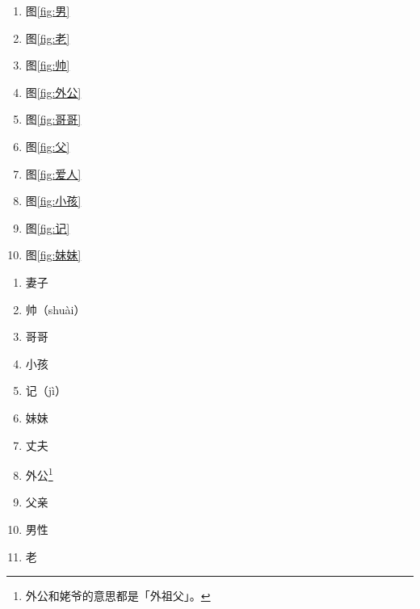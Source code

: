 \documentclass[12pt, a4paper, oneside]{ctexart}
\begin{document}
\begin{multicols}{2}
    \begin{enumerate}[label=\arabic*.]
        \item 图\ref{fig:男}
        \item 图\ref{fig:老}
        \item 图\ref{fig:帅}
        \item 图\ref{fig:外公}
        \item 图\ref{fig:哥哥}
        \item 图\ref{fig:父}
        \item 图\ref{fig:爱人}
        \item 图\ref{fig:小孩}
        \item 图\ref{fig:记}
        \item 图\ref{fig:妹妹}
    \end{enumerate}
    
    \columnbreak
    
    \begin{enumerate}[label=\Roman*.]
        \item 妻子
        \item 帅（shuài）
        \item 哥哥
        \item 小孩
        \item 记（jì）
        \item 妹妹
        \item 丈夫
        \item 外公\footnote{外公和姥爷的意思都是「外祖父」。}
        \item 父亲
        \item 男性
        \item 老
    \end{enumerate}
\end{multicols}
\end{document}
